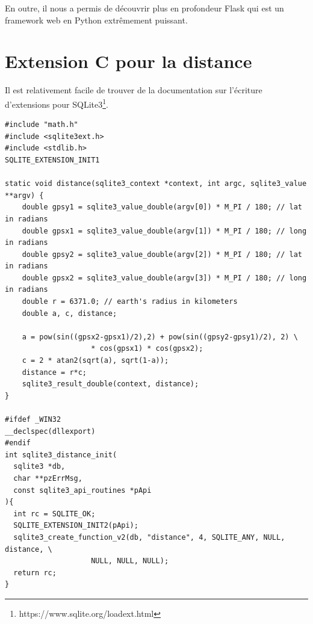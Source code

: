 \documentclass[a4paper]{article}
\begin{document}
En outre, il nous a permis de découvrir plus en profondeur Flask qui est un framework web en Python extrêmement puissant.

\appendix
\section{Extension C pour la distance}
\label{extension-c}
Il est relativement facile de trouver de la documentation sur l'écriture d'extensions pour SQLite3\footnote{https://www.sqlite.org/loadext.html}.

\begin{verbatim}
#include "math.h"
#include <sqlite3ext.h>
#include <stdlib.h> 
SQLITE_EXTENSION_INIT1

static void distance(sqlite3_context *context, int argc, sqlite3_value **argv) {
    double gpsy1 = sqlite3_value_double(argv[0]) * M_PI / 180; // lat in radians
    double gpsx1 = sqlite3_value_double(argv[1]) * M_PI / 180; // long in radians
    double gpsy2 = sqlite3_value_double(argv[2]) * M_PI / 180; // lat in radians
    double gpsx2 = sqlite3_value_double(argv[3]) * M_PI / 180; // long in radians
    double r = 6371.0; // earth's radius in kilometers
    double a, c, distance;

    a = pow(sin((gpsx2-gpsx1)/2),2) + pow(sin((gpsy2-gpsy1)/2), 2) \ 
                    * cos(gpsx1) * cos(gpsx2);
    c = 2 * atan2(sqrt(a), sqrt(1-a));
    distance = r*c;
    sqlite3_result_double(context, distance);
}

#ifdef _WIN32
__declspec(dllexport)
#endif
int sqlite3_distance_init(
  sqlite3 *db, 
  char **pzErrMsg, 
  const sqlite3_api_routines *pApi
){
  int rc = SQLITE_OK;
  SQLITE_EXTENSION_INIT2(pApi);
  sqlite3_create_function_v2(db, "distance", 4, SQLITE_ANY, NULL, distance, \
                    NULL, NULL, NULL);
  return rc;
}
\end{verbatim}
\end{document}
